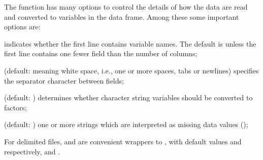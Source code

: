 \documentclass[10pt,krantz2]{krantz}\usepackage[]{graphicx}\usepackage[]{color}
\begin{document}
The function  has many options to control the details
of how the data are read and converted to variables in the data frame.
Among these some important options are:
\begin{description*}
  \item [\code{header}] indicates whether the first line contains
variable names. The default is  unless the first line contains one fewer field
than the number of columns;
  \item[\code{sep}] (default:  meaning white space, i.e., one or more spaces, tabs or newlines) specifies the separator character between fields;
  \item[\code{stringsAsFactors}] (default: ) determines whether character string variables should be converted to factors;
  \item[\code{na.strings}] (default: ) one or more strings which are interpreted
  as missing data values ();
\end{description*}
For delimited files,  and  are convenient wrappers
to , with default values  and 
respectively, and
.
\end{document}
